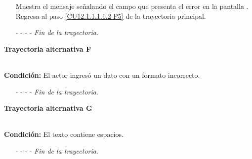 \begin{enumerate}
	\UCpaso[\UCsist] Muestra el mensaje  señalando el campo que presenta el error en la pantalla .
	\UCpaso Regresa al paso \ref{CU12.1.1.1.1.2-P5} de la trayectoria principal.
	\item[- -] - - {\em {Fin de la trayectoria}}.%
\end{enumerate}
\hypertarget{CU12-1-1-1-1-2:TAF}{\textbf{Trayectoria alternativa F}}\\
\noindent \textbf{Condición:} El actor ingresó un dato con un formato incorrecto.
\begin{enumerate}
	\UCpaso[\UCsist] Muestra el mensaje  señalando el campo que presenta el error en la pantalla .
	\UCpaso Regresa al paso \ref{CU12.1.1.1.1.2-P5} de la trayectoria principal.
	\item[- -] - - {\em {Fin de la trayectoria}}.
\end{enumerate}
\hypertarget{CU12-1-1-1-1-2:TAG}{\textbf{Trayectoria alternativa G}}\\
\noindent \textbf{Condición:} El texto contiene espacios.
\begin{enumerate}
	\UCpaso[\UCsist] Sustituye los espacios por guiones bajos.
	\UCpaso Continua en el \ref{CU12.1.1.1.1.2-TA1} de la trayectoria alternativa B.
	\item[- -] - - {\em {Fin de la trayectoria}}.
\end{enumerate}